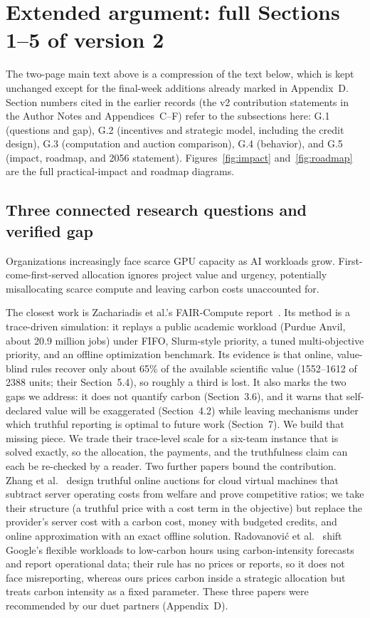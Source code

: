 \section{Extended argument: full Sections 1--5 of version 2}\label{app:extended}
The two-page main text above is a compression of the text below, which is kept unchanged except for the final-week additions already marked in Appendix~D. Section numbers cited in the earlier records (the v2 contribution statements in the Author Notes and Appendices~C--F) refer to the subsections here: G.1 (questions and gap), G.2 (incentives and strategic model, including the credit design), G.3 (computation and auction comparison), G.4 (behavior), and G.5 (impact, roadmap, and 2056 statement). Figures~\ref{fig:impact} and~\ref{fig:roadmap} are the full practical-impact and roadmap diagrams.

\subsection{Three connected research questions and verified gap}

\noindent
Organizations increasingly face scarce GPU capacity as AI workloads grow. First-come-first-served allocation ignores project value and urgency, potentially misallocating scarce compute and leaving carbon costs unaccounted for.

\vspace{3pt}

\noindent
The closest work is Zachariadis et al.'s FAIR-Compute report~\cite{fair_compute2026}. Its method is a trace-driven simulation: it replays a public academic workload (Purdue Anvil, about 20.9 million jobs) under FIFO, Slurm-style priority, a tuned multi-objective priority, and an offline optimization benchmark. Its evidence is that online, value-blind rules recover only about 65\% of the available scientific value (1552--1612 of 2388 units; their Section~5.4), so roughly a third is lost. It also marks the two gaps we address: it does not quantify carbon (Section~3.6), and it warns that self-declared value will be exaggerated (Section~4.2) while leaving mechanisms under which truthful reporting is optimal to future work (Section~7). We build that missing piece. We trade their trace-level scale for a six-team instance that is solved exactly, so the allocation, the payments, and the truthfulness claim can each be re-checked by a reader. Two further papers bound the contribution. Zhang et al.~\cite{zhang2015iaas} design truthful online auctions for cloud virtual machines that subtract server operating costs from welfare and prove competitive ratios; we take their structure (a truthful price with a cost term in the objective) but replace the provider's server cost with a carbon cost, money with budgeted credits, and online approximation with an exact offline solution. Radovanovi\'c et al.~\cite{radovanovic2021carbon} shift Google's flexible workloads to low-carbon hours using carbon-intensity forecasts and report operational data; their rule has no prices or reports, so it does not face misreporting, whereas ours prices carbon inside a strategic allocation but treats carbon intensity as a fixed parameter. These three papers were recommended by our duet partners (Appendix~D).

